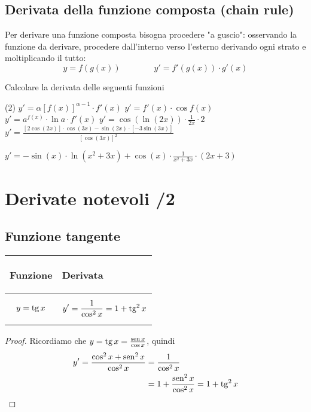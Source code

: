 \documentclass{book}     %
\begin{document}
\subsection{Derivata della funzione composta (chain rule)}
Per derivare una funzione composta bisogna procedere "a guscio": osservando la funzione da derivare, procedere dall'interno verso l'esterno derivando ogni strato e moltiplicando il tutto:
\[y=f(g(x))\qquad\qquad y'=f'(g(x))\cdot g'(x)\]
\begin{ex}[
    Calcolare la derivata delle seguenti funzioni
        \begin{tasks}(2)
            \task $y={[f(x)]}^{\alpha}$
            \task $y=\sin f(x)$
            \task $y=a^{f(x)}$
            \task $y=\sin(\ln(2x))$
            \task $y=\frac{\sin (2x)}{\cos (3x)}$
            \task $y=\cos(x)\cdot \ln (x^2+3x)$
        \end{tasks}
    ]
    Calcolare la derivata delle seguenti funzioni
    \begin{tasks}(2)
        \task $y'=\alpha{[f(x)]}^{\alpha-1}\cdot f'(x)$
        \task $y'=f'(x)\cdot\cos f(x)$
        \task $y'=a^{f(x)}\cdot \ln a \cdot f'(x)$
        \task $y'=\cos(\ln (2x))\cdot \frac{1}{2x}\cdot 2$
        \task $y'=\frac{[2\cos (2x)]\cdot \cos (3x)-\sin(2x)\cdot[-3\sin(3x)]}{[\cos (3x)]^2}$
    \end{tasks}
    \begin{tasks}[resume]
        \task $y'=-\sin(x)\cdot \ln (x^2+3x)+\cos(x)\cdot \frac{1}{x^2+3x}\cdot\left( 2x+3 \right)$
    \end{tasks}
\end{ex}
\section{Derivate notevoli /2}
\subsection{Funzione tangente}
\begin{center}
    \begin{tabular}{m{}|m{}}
        \begin{center}
            \textbf{Funzione}
        \end{center}
        & 
        \begin{center}
            \textbf{Derivata}
        \end{center}\\
        \hline
            \[y=\operatorname{tg} x\] &
            \[y'=\frac{1}{\cos^2x}=1+\operatorname{tg}^2x\]
    \end{tabular}
\end{center}
    \begin{proof}
        Ricordiamo che $y=\operatorname{tg} x =\frac{\operatorname{sen} x}{\cos x}$, quindi 
        \[\begin{aligned}
            y'=\frac{\cos^2 x+\operatorname{sen}^2 x}{\cos^2 x} &= \frac{1}{\cos^2 x}\\
                                                  &= 1+ \frac{\operatorname{sen}^2x}{\cos^2x }= 1+\operatorname{tg}^2x 
        \end{aligned}\]
    \end{proof}
\end{document}
